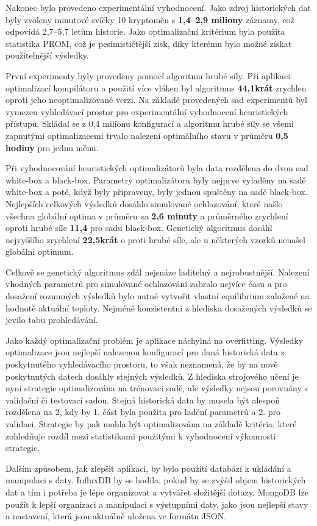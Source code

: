 Nakonec bylo provedeno experimentální vyhodnocení.
Jako zdroj historických dat byly zvoleny minutové svíčky 10 kryptoměn s \textbf{1,4--2,9 miliony} záznamy, což odpovídá 2,7--5,7 letům historie.
Jako optimalizační kritérium byla použita statistika PROM, což je pesimističtější zisk, díky kterému bylo možné získat použitelnější výsledky.

První experimenty byly provedeny pomocí algoritmu hrubé síly.
Při aplikaci optimalizací kompilátoru a použití více vláken byl algoritmus \textbf{44,1krát} zrychlen oproti jeho neoptimalizované verzi.
Na základě provedených sad experimentů byl vymezen vyhledávací prostor pro experimentální vyhodnocení heuristických přístupů.
Skládal se z 0,4 milionu konfigurací a algoritmu hrubé síly se všemi zapnutými optimalizacemi trvalo nalezení optimálního stavu v průměru \textbf{0,5 hodiny} pro jednu měnu.

Při vyhodnocování heuristických optimalizátorů byla data rozdělena do dvou sad white-box a black-box.
Parametry optimalizátoru byly nejprve vyladěny na sadě white-box a poté, když byly připraveny, byly jednou spuštěny na sadě black-box.
Nejlepších celkových výsledků dosáhlo simulované ochlazování, které našlo všechna globální optima v průměru za \textbf{2,6 minuty} a průměrného zrychlení oproti hrubé síle \textbf{11,4} pro sadu black-box.
Genetický algoritmus dosáhl nejvyššího zrychlení \textbf{22,5krát} o proti hrubé síle, ale u některých vzorků nenašel globální optimum.

Celkově se genetický algoritmus zdál nejsnáze laditelný a nejrobustnější.
Nalezení vhodných parametrů pro simulované ochlazování zabralo nejvíce času a pro dosažení rozumných výsledků bylo nutné vytvořit vlastní equilibrium založené na hodnotě aktuální teploty.
Nejméně konzistentní z hlediska dosažených výsledků se jevilo tabu prohledávání.

Jako každý optimalizační problém je aplikace náchylná na overfitting.
Výsledky optimalizace jsou nejlepší nalezenou konfigurací pro daná historická data z poskytnutého vyhledávacího prostoru, to však neznamená, že by na nově poskytnutých datech dosáhly stejných výsledků.
Z hlediska strojového učení je nyní strategie optimalizována na trénovací sadě, ale výsledky nejsou porovnány s validační či testovací sadou.
Stejná historická data by musela být alespoň rozdělena na 2, kdy by 1. část byla použita pro ladění parametrů a 2. pro validaci.
Strategie by pak mohla být optimalizována na základě kritéria, které zohledňuje rozdíl mezi statistikami použitými k vyhodnocení výkonnosti strategie.

Dalším způsobem, jak zlepšit aplikaci, by bylo použití databází k ukládání a manipulaci s daty.
InfluxDB by se hodila, pokud by se zvýšil objem historických dat a tím i potřeba je lépe organizovat a vytvářet složitější dotazy.
MongoDB lze použít k lepší organizaci a manipulaci s výstupními daty, jako jsou nejlepší stavy a nastavení, která jsou aktuálně uložena ve formátu JSON.
